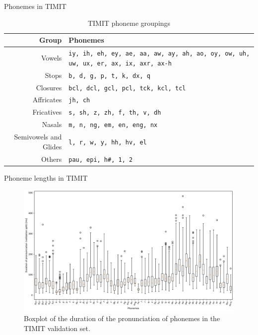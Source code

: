 \documentclass[
  ignorenonframetext,
  aspectratio=169,
]{beamer}
\begin{document}
\begin{frame}{Phonemes in TIMIT}
\protect\hypertarget{phonemes-in-timit}{}
\begin{table}[htb]
    \centering
    \begin{tabular}{r|p{8cm}}
        Group & Phonemes \\
        \hline
        Vowels & \texttt{iy, ih, eh, ey, ae, aa, aw, ay, ah, ao, oy, ow, uh, uw, ux, er, ax, ix, axr, ax-h} \\
        Stops & \texttt{b, d, g, p, t, k, dx, q} \\
        Closures & \texttt{bcl, dcl, gcl, pcl, tck, kcl, tcl} \\
        Affricates & \texttt{jh, ch} \\
        Fricatives & \texttt{s, sh, z, zh, f, th, v, dh} \\
        Nasals & \texttt{m, n, ng, em, en, eng, nx} \\
        Semivowels and Glides & \texttt{l, r, w, y, hh, hv, el} \\
        Others & \texttt{pau, epi, h\#, 1, 2} \\ 
    \end{tabular}
    \caption{TIMIT phoneme groupings}
    \label{tab:timit-phonemes}
\end{table}
\end{frame}

\begin{frame}{Phoneme lengths in TIMIT}
\protect\hypertarget{phoneme-lengths-in-timit}{}
\begin{figure}[t!]
    \centering
    \hfill
    \includegraphics[width=\columnwidth]{gfx/TIMIT_validation_set_phoneme_duration_boxplot_speaker_id_None.pdf}
    \caption{Boxplot of the duration of the pronunciation of phonemes in the TIMIT validation set.}
    \label{fig:timit-phoneme-duration}
\end{figure}
\end{frame}
\end{document}
